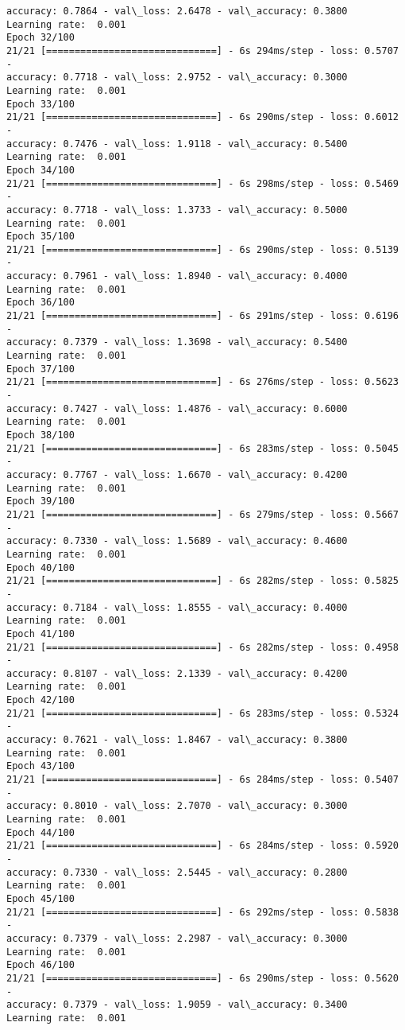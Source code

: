 \documentclass[11pt]{article}
\begin{document}
\begin{Verbatim}[commandchars=\\\{\}]
accuracy: 0.7864 - val\_loss: 2.6478 - val\_accuracy: 0.3800
Learning rate:  0.001
Epoch 32/100
21/21 [==============================] - 6s 294ms/step - loss: 0.5707 -
accuracy: 0.7718 - val\_loss: 2.9752 - val\_accuracy: 0.3000
Learning rate:  0.001
Epoch 33/100
21/21 [==============================] - 6s 290ms/step - loss: 0.6012 -
accuracy: 0.7476 - val\_loss: 1.9118 - val\_accuracy: 0.5400
Learning rate:  0.001
Epoch 34/100
21/21 [==============================] - 6s 298ms/step - loss: 0.5469 -
accuracy: 0.7718 - val\_loss: 1.3733 - val\_accuracy: 0.5000
Learning rate:  0.001
Epoch 35/100
21/21 [==============================] - 6s 290ms/step - loss: 0.5139 -
accuracy: 0.7961 - val\_loss: 1.8940 - val\_accuracy: 0.4000
Learning rate:  0.001
Epoch 36/100
21/21 [==============================] - 6s 291ms/step - loss: 0.6196 -
accuracy: 0.7379 - val\_loss: 1.3698 - val\_accuracy: 0.5400
Learning rate:  0.001
Epoch 37/100
21/21 [==============================] - 6s 276ms/step - loss: 0.5623 -
accuracy: 0.7427 - val\_loss: 1.4876 - val\_accuracy: 0.6000
Learning rate:  0.001
Epoch 38/100
21/21 [==============================] - 6s 283ms/step - loss: 0.5045 -
accuracy: 0.7767 - val\_loss: 1.6670 - val\_accuracy: 0.4200
Learning rate:  0.001
Epoch 39/100
21/21 [==============================] - 6s 279ms/step - loss: 0.5667 -
accuracy: 0.7330 - val\_loss: 1.5689 - val\_accuracy: 0.4600
Learning rate:  0.001
Epoch 40/100
21/21 [==============================] - 6s 282ms/step - loss: 0.5825 -
accuracy: 0.7184 - val\_loss: 1.8555 - val\_accuracy: 0.4000
Learning rate:  0.001
Epoch 41/100
21/21 [==============================] - 6s 282ms/step - loss: 0.4958 -
accuracy: 0.8107 - val\_loss: 2.1339 - val\_accuracy: 0.4200
Learning rate:  0.001
Epoch 42/100
21/21 [==============================] - 6s 283ms/step - loss: 0.5324 -
accuracy: 0.7621 - val\_loss: 1.8467 - val\_accuracy: 0.3800
Learning rate:  0.001
Epoch 43/100
21/21 [==============================] - 6s 284ms/step - loss: 0.5407 -
accuracy: 0.8010 - val\_loss: 2.7070 - val\_accuracy: 0.3000
Learning rate:  0.001
Epoch 44/100
21/21 [==============================] - 6s 284ms/step - loss: 0.5920 -
accuracy: 0.7330 - val\_loss: 2.5445 - val\_accuracy: 0.2800
Learning rate:  0.001
Epoch 45/100
21/21 [==============================] - 6s 292ms/step - loss: 0.5838 -
accuracy: 0.7379 - val\_loss: 2.2987 - val\_accuracy: 0.3000
Learning rate:  0.001
Epoch 46/100
21/21 [==============================] - 6s 290ms/step - loss: 0.5620 -
accuracy: 0.7379 - val\_loss: 1.9059 - val\_accuracy: 0.3400
Learning rate:  0.001

\end{Verbatim}
\end{document}
